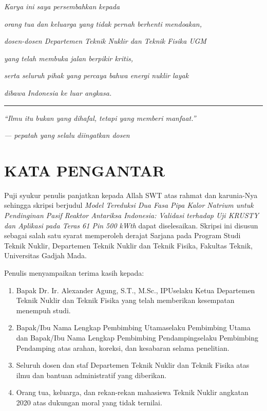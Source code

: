 \documentclass[
  indonesian,
  12pt,
  a4paper,
]{report}
\providecommand{\tightlist}{%
  \setlength{\itemsep}{0pt}\setlength{\parskip}{0pt}}
\newcommand{\pembimbingutama}{Nama Lengkap Pembimbing Utama}
\newcommand{\pembimbingpendamping}{Nama Lengkap Pembimbing Pendamping}
\newcommand{\ketuadepartemen}{Dr. Ir. Alexander Agung, S.T., M.Sc., IPU}
\begin{document}
\protect{}\label{persembahan}
\emph{Karya ini saya persembahkan kepada}

\emph{orang tua dan keluarga yang tidak pernah berhenti mendoakan,}

\emph{dosen-dosen Departemen Teknik Nuklir dan Teknik Fisika UGM}

\emph{yang telah membuka jalan berpikir kritis,}

\emph{serta seluruh pihak yang percaya bahwa energi nuklir layak}

\emph{dibawa Indonesia ke luar angkasa.}

\begin{center}\rule{0.5\linewidth}{0.5pt}\end{center}

\emph{``Ilmu itu bukan yang dihafal, tetapi yang memberi manfaat.''}

\emph{--- pepatah yang selalu diingatkan dosen}

\chapter*{KATA PENGANTAR}\label{kata-pengantar}

Puji syukur penulis panjatkan kepada Allah SWT atas rahmat dan
karunia-Nya sehingga skripsi berjudul \emph{Model Tereduksi Dua Fasa
Pipa Kalor Natrium untuk Pendinginan Pasif Reaktor Antariksa Indonesia:
Validasi terhadap Uji KRUSTY dan Aplikasi pada Teras 61 Pin 500 kWth}
dapat diselesaikan. Skripsi ini disusun sebagai salah satu syarat
memperoleh derajat Sarjana pada Program Studi Teknik Nuklir, Departemen
Teknik Nuklir dan Teknik Fisika, Fakultas Teknik, Universitas Gadjah
Mada.

Penulis menyampaikan terima kasih kepada:

\begin{enumerate}
\def\labelenumi{\arabic{enumi}.}
\tightlist
\item
  Bapak \ketuadepartemen selaku Ketua Departemen Teknik Nuklir dan
  Teknik Fisika yang telah memberikan kesempatan menempuh studi.
\item
  Bapak/Ibu \pembimbingutama selaku Pembimbing Utama dan Bapak/Ibu
  \pembimbingpendamping selaku Pembimbing Pendamping atas arahan,
  koreksi, dan kesabaran selama penelitian.
\item
  Seluruh dosen dan staf Departemen Teknik Nuklir dan Teknik Fisika atas
  ilmu dan bantuan administratif yang diberikan.
\item
  Orang tua, keluarga, dan rekan-rekan mahasiswa Teknik Nuklir angkatan
  2020 atas dukungan moral yang tidak ternilai.
\end{enumerate}
\end{document}
